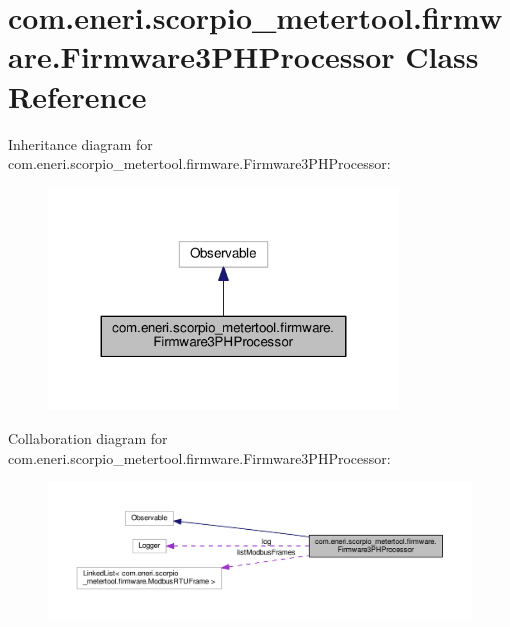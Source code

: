 \hypertarget{classcom_1_1eneri_1_1scorpio__metertool_1_1firmware_1_1_firmware3_p_h_processor}{}\section{com.\+eneri.\+scorpio\+\_\+metertool.\+firmware.\+Firmware3\+P\+H\+Processor Class Reference}
\label{classcom_1_1eneri_1_1scorpio__metertool_1_1firmware_1_1_firmware3_p_h_processor}


Inheritance diagram for com.\+eneri.\+scorpio\+\_\+metertool.\+firmware.\+Firmware3\+P\+H\+Processor\+:
\nopagebreak
\begin{figure}[H]
\begin{center}
\leavevmode
\includegraphics[width=263pt]{classcom_1_1eneri_1_1scorpio__metertool_1_1firmware_1_1_firmware3_p_h_processor__inherit__graph}
\end{center}
\end{figure}


Collaboration diagram for com.\+eneri.\+scorpio\+\_\+metertool.\+firmware.\+Firmware3\+P\+H\+Processor\+:
\nopagebreak
\begin{figure}[H]
\begin{center}
\leavevmode
\includegraphics[width=350pt]{classcom_1_1eneri_1_1scorpio__metertool_1_1firmware_1_1_firmware3_p_h_processor__coll__graph}
\end{center}
\end{figure}
